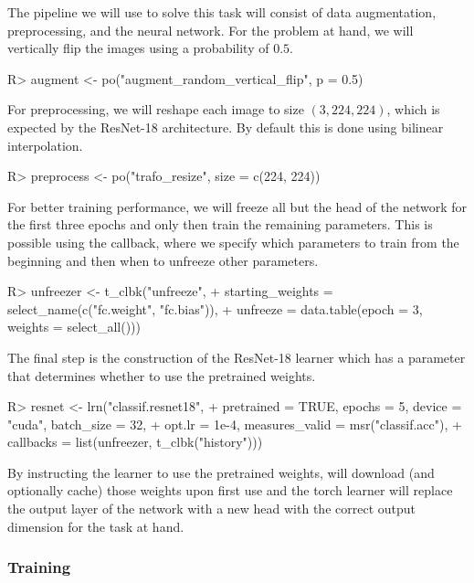 \documentclass[article]{jss}
\theoremstyle{definition}
\begin{document}
The pipeline we will use to solve this task will consist of data augmentation, preprocessing, and the neural network.
For the problem at hand, we will vertically flip the images using a probability of $0.5$.

\begin{CodeInput}
R> augment <- po("augment_random_vertical_flip", p = 0.5)
\end{CodeInput}

For preprocessing, we will reshape each image to size $(3, 224, 224)$, which is expected by the ResNet-18 architecture.
By default this is done using bilinear interpolation.

\begin{CodeInput}
R> preprocess <- po("trafo_resize", size = c(224, 224))
\end{CodeInput}

For better training performance, we will freeze all but the head of the network for the first three epochs and only then train the remaining parameters.
This is possible using the  callback, where we specify which parameters to train from the beginning and then when to unfreeze other parameters.

\begin{CodeInput}
R> unfreezer <- t_clbk("unfreeze",
+    starting_weights = select_name(c("fc.weight", "fc.bias")),
+    unfreeze = data.table(epoch = 3, weights = select_all()))
\end{CodeInput}

The final step is the construction of the ResNet-18 learner which has a parameter  that determines whether to use the pretrained weights.

\begin{CodeInput}
R> resnet <- lrn("classif.resnet18",
+    pretrained = TRUE, epochs = 5, device = "cuda", batch_size = 32,
+    opt.lr = 1e-4, measures_valid = msr("classif.acc"),
+    callbacks = list(unfreezer, t_clbk("history")))
\end{CodeInput}

By instructing the learner to use the pretrained weights,  will download (and optionally cache) those weights upon first use and the torch learner will replace the output layer of the network with a new head with the correct output dimension for the task at hand.

\subsubsection{Training}
\end{document}
